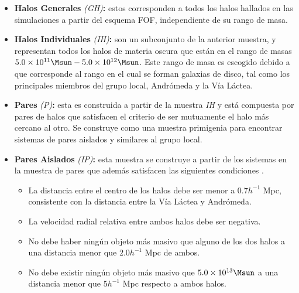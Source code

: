 \begin{itemize}
\item \textbf{Halos Generales} \textit{(GH)}\textbf{:} estos corresponden a
todos los halos hallados en las simulaciones a partir del esquema FOF, 
independiente de su rango de masa.

\item \textbf{Halos Individuales} \textit{(IH)}\textbf{:} son un subconjunto 
de la anterior muestra, y representan todos los halos de materia oscura que 
están en el rango de masas $5.0 \times 10^{11}\Msun - 5.0\times 10 ^{12}\Msun$. 
Este rango de masa es escogido debido a que corresponde al rango en el cual 
se forman galaxias de disco, tal como los principales miembros del grupo local,
Andrómeda y la Vía Láctea.

\item \textbf{Pares} \textit{(P)}\textbf{:} esta es construida a partir de 
la muestra \textit{IH} y está compuesta por pares de halos que satisfacen el 
criterio de ser mutuamente el halo más cercano al otro. Se construye como una 
muestra primigenia para encontrar sistemas de pares aislados y similares al 
grupo local.

\item \textbf{Pares Aislados} \textit{(IP)}\textbf{:} esta muestra se construye
a partir de los sistemas en la muestra de pares que además satisfacen las 
siguientes condiciones \cite{forero2011} \cite{forero2013}.


	\begin{itemize}
	\item La distancia entre el centro de los halos debe ser menor a 
	$0.7 h^{-1}$ Mpc, consistente con la distancia entre la Vía Láctea
	y Andrómeda.
	\item La velocidad radial relativa entre ambos halos debe ser negativa.
	\item No debe haber ningún objeto más masivo que alguno de los dos halos
	a una distancia menor que $2.0 h^{-1}$ Mpc de ambos.
	\item No debe existir ningún objeto más masivo que $5.0 \times 10^{13}\Msun$
	a una distancia menor que $5h^{-1}$ Mpc respecto a ambos halos.
	\end{itemize}
	


\end{itemize}
